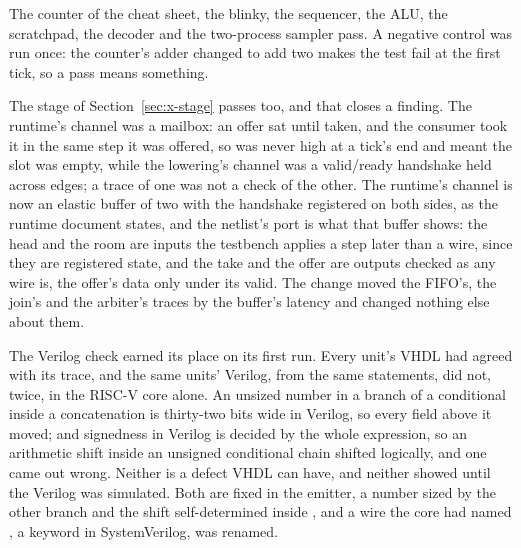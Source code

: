 The counter of the cheat sheet, the blinky, the sequencer, the ALU,
the scratchpad, the decoder and the two-process sampler pass.
A negative control was run once: the counter's adder changed to add
two makes the test fail at the first tick, so a pass means something.

The stage of Section~\ref{sec:x-stage} passes too, and that closes a
finding. The runtime's channel was a mailbox: an offer sat until
taken, and the consumer took it in the same step it was offered, so
 was never high at a tick's end and  meant
the slot was empty, while the lowering's channel was a valid/ready
handshake held across edges; a trace of one was not a check of the
other. The runtime's channel is now an elastic buffer of two with the
handshake registered on both sides, as the runtime document states,
and the netlist's port is what that buffer shows: the head and the
room are inputs the testbench applies a step later than a wire, since
they are registered state, and the take and the offer are outputs
checked as any wire is, the offer's data only under its valid. The
change moved the FIFO's, the join's and the arbiter's traces by the
buffer's latency and changed nothing else about them.

The Verilog check earned its place on its first run. Every unit's
VHDL had agreed with its trace, and the same units' Verilog, from the
same statements, did not, twice, in the RISC-V core alone. An unsized
number in a branch of a conditional inside a concatenation is thirty-two
bits wide in Verilog, so every field above it moved; and signedness in
Verilog is decided by the whole expression, so an arithmetic shift
inside an unsigned conditional chain shifted logically, and one
 came out wrong. Neither is a defect VHDL can have, and
neither showed until the Verilog was simulated. Both are fixed in the
emitter, a number sized by the other branch and the shift
self-determined inside , and a wire the core had
named , a keyword in SystemVerilog, was renamed.
